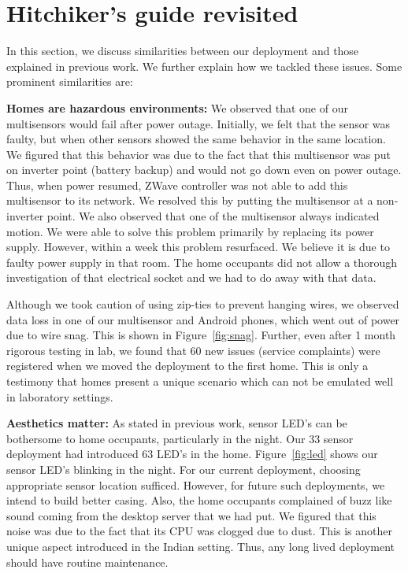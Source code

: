 \documentclass[10pt]{sensys-proc}
\newcommand{\figref}[1]{Figure~\ref{#1}}
\begin{document}
\section{Hitchiker's guide revisited}
\label{sec:common}
In this section, we discuss similarities between our deployment and those explained in previous work. We further explain how we tackled these issues. Some prominent similarities are:

\noindent \textbf{Homes are hazardous environments:} We observed that one of our multisensors would fail after power outage. Initially, we felt that the sensor was faulty, but when other sensors showed the same behavior in the same location. We figured that this behavior was due to the fact that this multisensor was put on inverter point (battery backup) and would not go down even on power outage. Thus, when power resumed, ZWave controller was not able to add this multisensor to its network. We resolved this by putting the multisensor at a non-inverter point. We also observed that one of the multisensor always indicated motion. We were able to solve this problem primarily by replacing its power supply. However, within a week this problem resurfaced. We believe it is due to faulty power supply in that room. The home occupants did not allow a thorough investigation of that electrical socket and we had to do away with that data.

\noindent Although we took caution of using zip-ties to prevent hanging wires, we observed data loss in one of our multisensor and Android phones, which went out of power due to wire snag. This is shown in \figref{fig:snag}. Further, even after 1 month rigorous testing in lab, we found that 60 new issues (service complaints) were registered when we moved the deployment to the first home. This is only a testimony that homes present a unique scenario which can not be emulated well in laboratory settings.

\noindent \textbf{Aesthetics matter:} As stated in previous work, sensor LED's can be bothersome to home occupants, particularly in the night. Our 33 sensor deployment had introduced 63 LED's in the home. \figref{fig:led} shows our sensor LED's blinking in the night. For our current deployment, choosing appropriate sensor location sufficed. However, for future such deployments, we intend to build better casing. Also, the home occupants complained of buzz like sound coming from the desktop server that we had put. We figured that this noise was due to the fact that its CPU was clogged due to dust. This is another unique aspect introduced in the Indian setting. Thus, any long lived deployment should have routine maintenance.
\end{document}
